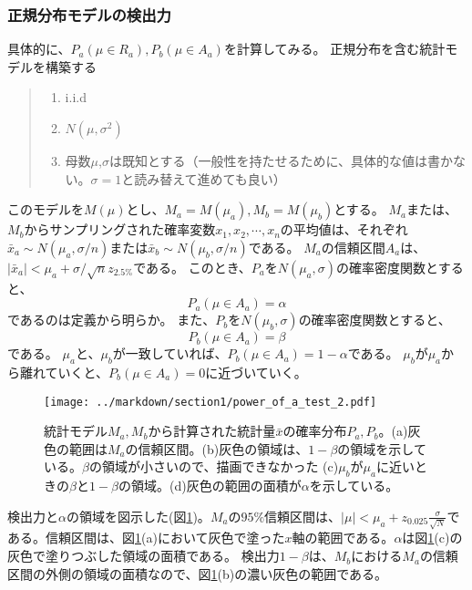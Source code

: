 \documentclass[a4paper,11pt,dvipdfmx]{jsarticle}
\begin{document}
\subsubsection{正規分布モデルの検出力}
具体的に、$P_a(\mu \in R_a),P_b(\mu\in A_a)$を計算してみる。
正規分布を含む統計モデルを構築する
\begin{quote}
    \begin{enumerate}[(1)]
\item i.i.d
\item $N(\mu,\sigma^2)$
\item 母数$\mu$,$\sigma$は既知とする（一般性を持たせるために、具体的な値は書かない。$\sigma=1$と読み替えて進めても良い）
\end{enumerate}
\end{quote}
このモデルを$M(\mu)$とし、$M_a=M(\mu_a),M_b=M(\mu_b)$とする。
$M_a$または、$M_b$からサンプリングされた確率変数$x_1,x_2,\cdots,x_n$の平均値は、それぞれ$\bar{x}_a\sim N(\mu_a,\sigma/n)$または$\bar{x}_b\sim N(\mu_b,\sigma/n)$である。
$M_a$の信頼区間$A_a$は、$|\bar{x}_a|<\mu_a+\sigma / \sqrt{n}z_{2.5\%}$である。
このとき、$P_a$を$N(\mu_a,\sigma)$の確率密度関数とすると、
\begin{equation*}
    P_a(\mu \in A_a) = \alpha
\end{equation*}
であるのは定義から明らか。
また、$P_b$を$N(\mu_b,\sigma)$の確率密度関数とすると、
\begin{equation*}
    P_b(\mu \in A_a ) = \beta
\end{equation*}
である。
$\mu_a$と、$\mu_b$が一致していれば、$P_b(\mu \in A_a ) = 1-\alpha$である。
$\mu_b$が$\mu_a$から離れていくと、$P_b(\mu \in A_a)=0$に近づいていく。


\begin{figure}
\begin{center}
    \texttt{[image: ../markdown/section1/power\_of\_a\_test\_2.pdf]}
    \caption{統計モデル$M_a,M_b$から計算された統計量$\bar{x}$の確率分布$P_a,P_b$。(a)灰色の範囲は$M_a$の信頼区間。(b)灰色の領域は、$1-\beta$の領域を示している。$\beta$の領域が小さいので、描画できなかった (c)$\mu_b$が$\mu_a$に近いときの$\beta$と$1-\beta$の領域。(d)灰色の範囲の面積が$\alpha$を示している。}
    \label{fig:power_of_test_alpha_beta}
\end{center}
\end{figure}


検出力と$\alpha$の領域を図示した(図\ref{fig:power_of_test_alpha_beta})。$M_a$の$95\%$信頼区間は、$|\mu|<\mu_a+z_{0.025}\frac{\sigma}{\sqrt{N}}$である。信頼区間は、図\ref{fig:power_of_test_alpha_beta}(a)において灰色で塗った$x$軸の範囲である。$\alpha$は図\ref{fig:power_of_test_alpha_beta}(c)の灰色で塗りつぶした領域の面積である。
検出力$1-\beta$は、$M_b$における$M_a$の信頼区間の外側の領域の面積なので、図\ref{fig:power_of_test_alpha_beta}(b)の濃い灰色の範囲である。
\end{document}
